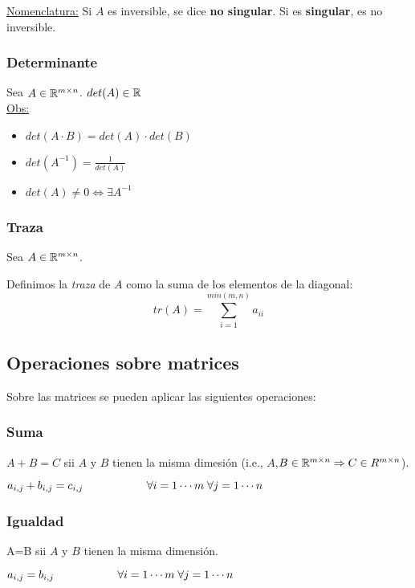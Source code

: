 \underline{Nomenclatura:} Si $A$ es inversible, se dice \textbf{no singular}. Si es \textbf{singular}, es no inversible.

\subsubsection{Determinante}
Sea $A \in\mathbb{R}^{m\times n}$. $det(A)\in\mathbb{R}$\\
\underline{Obs:}
\begin{itemize}
	\item $det(A\cdot B) = det(A) \cdot det(B)$
	\item $det(A^{-1}) = \displaystyle \frac{1}{det(A)}$
	\item $det(A)\neq 0 \Leftrightarrow \exists A^{-1}$
\end{itemize}

\subsubsection{Traza}
Sea $A \in\mathbb{R}^{m\times n}$.

\begin{defi}
	Definimos la \textit{traza} de $A$ como la suma de los elementos de la diagonal:
	$$tr(A) = \sum_{i=1}^{min(m,n)}{a_{ii}}$$
\end{defi}

\subsection{Operaciones sobre matrices}
Sobre las matrices se pueden aplicar las siguientes operaciones:

\subsubsection{Suma}
$A + B = C$ sii $A$ y $B$ tienen la misma dimesión (i.e., $A$,$B \in \mathbb{R}^{m\times n} \Rightarrow C \in R^{m\times n}$).
	\begin{center}
		$a_{i,j} + b_{i,j} = c_{i,j} \hspace{2cm} \forall i=1\cdots m \; \forall j = 1\cdots n$
	\end{center}

\subsubsection{Igualdad}
A=B sii $A$ y $B$ tienen la misma dimensión.
	\begin{center}
		$a_{i,j} = b_{i,j} \hspace{2cm} \forall i=1\cdots m \; \forall j = 1\cdots n$
	\end{center}

